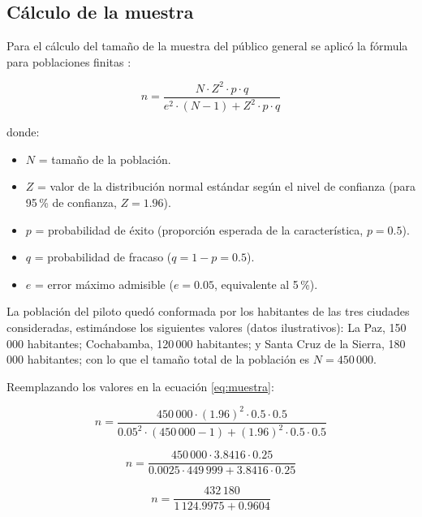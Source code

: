 \subsection{C\'alculo de la muestra}

Para el c\'alculo del tama\~no de la muestra del p\'ublico general se aplic\'o
la f\'ormula para poblaciones finitas \citep{hernandez2014}:

\begin{equation}
n = \frac{N \cdot Z^2 \cdot p \cdot q}{e^2 \cdot (N - 1) + Z^2 \cdot p \cdot q}
\label{eq:muestra}
\end{equation}

donde:

\begin{itemize}
  \item $N$ = tama\~no de la poblaci\'on.
  \item $Z$ = valor de la distribuci\'on normal est\'andar seg\'un el nivel de
    confianza (para 95\,\% de confianza, $Z = 1.96$).
  \item $p$ = probabilidad de \'exito (proporci\'on esperada de la
    caracter\'istica, $p = 0.5$).
  \item $q$ = probabilidad de fracaso ($q = 1 - p = 0.5$).
  \item $e$ = error m\'aximo admisible ($e = 0.05$, equivalente al 5\,\%).

\end{itemize}

La poblaci\'on del piloto qued\'o conformada por los habitantes de las tres
ciudades consideradas, estim\'andose los siguientes valores (datos
ilustrativos): La Paz, 150\,000 habitantes; Cochabamba, 120\,000 habitantes;
y Santa Cruz de la Sierra, 180\,000 habitantes; con lo que el tama\~no total
de la poblaci\'on es $N = 450\,000$.

Reemplazando los valores en la ecuaci\'on \eqref{eq:muestra}:

\begin{equation}
n = \frac{450\,000 \cdot (1.96)^2 \cdot 0.5 \cdot 0.5}{0.05^2 \cdot (450\,000 - 1) + (1.96)^2 \cdot 0.5 \cdot 0.5}
\end{equation}

\begin{equation}
n = \frac{450\,000 \cdot 3.8416 \cdot 0.25}{0.0025 \cdot 449\,999 + 3.8416 \cdot 0.25}
\label{eq:muestra-operada}
\end{equation}

\begin{equation}
n = \frac{432\,180}{1\,124.9975 + 0.9604}
\label{eq:muestra-operada2}
\end{equation}

